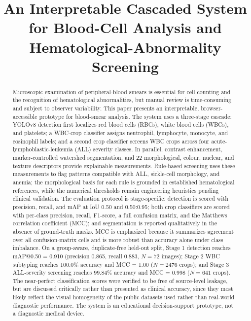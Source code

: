 \documentclass[conference]{IEEEtran}
\begin{document}
\title{An Interpretable Cascaded System for Blood-Cell Analysis and Hematological-Abnormality Screening}

\author{
}

\maketitle

\begin{abstract}
Microscopic examination of peripheral-blood smears is essential for cell counting and the recognition of hematological abnormalities, but manual review is time-consuming and subject to observer variability. This paper presents an interpretable, browser-accessible prototype for blood-smear analysis. The system uses a three-stage cascade: YOLOv8 detection first localizes red blood cells (RBCs), white blood cells (WBCs), and platelets; a WBC-crop classifier assigns neutrophil, lymphocyte, monocyte, and eosinophil labels; and a second crop classifier screens WBC crops across four acute-lymphoblastic-leukemia (ALL) severity classes. In parallel, contrast enhancement, marker-controlled watershed segmentation, and 22 morphological, colour, nuclear, and texture descriptors provide explainable measurements. Rule-based screening uses these measurements to flag patterns compatible with ALL, sickle-cell morphology, and anemia; the morphological basis for each rule is grounded in established hematological references, while the numerical thresholds remain engineering heuristics pending clinical validation. The evaluation protocol is stage-specific: detection is scored with precision, recall, and mAP at IoU 0.50 and 0.50:0.95; both crop classifiers are scored with per-class precision, recall, F1-score, a full confusion matrix, and the Matthews correlation coefficient (MCC); and segmentation is reported qualitatively in the absence of ground-truth masks. MCC is emphasized because it summarizes agreement over all confusion-matrix cells and is more robust than accuracy alone under class imbalance. On a group-aware, duplicate-free held-out split, Stage 1 detection reaches mAP@0.50 = 0.910 (precision 0.865, recall 0.883, $N=72$ images); Stage 2 WBC subtyping reaches 100.0\% accuracy and MCC = 1.00 ($N=2476$ crops); and Stage 3 ALL-severity screening reaches 99.84\% accuracy and MCC = 0.998 ($N=641$ crops). The near-perfect classification scores were verified to be free of source-level leakage, but are discussed critically rather than presented as clinical accuracy, since they most likely reflect the visual homogeneity of the public datasets used rather than real-world diagnostic performance. The system is an educational decision-support prototype, not a diagnostic medical device.
\end{abstract}
\end{document}

